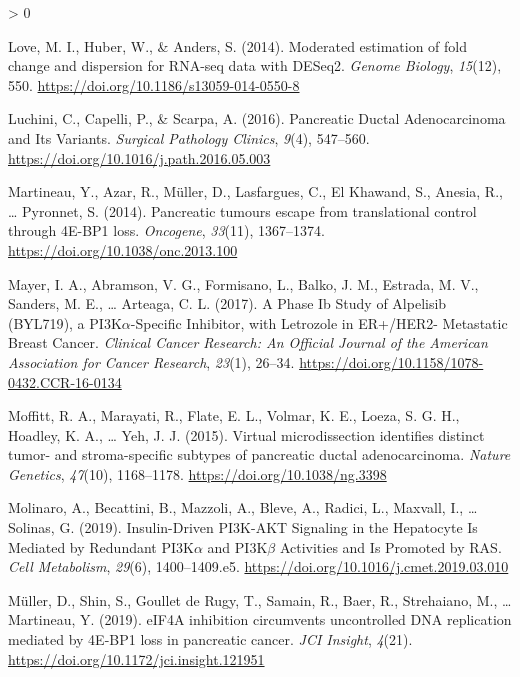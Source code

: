 \documentclass[
  12pt,
  openany]{book}
\newlength{\cslhangindent}
\newenvironment{CSLReferences}[2] %
 {%
  \setlength{\parindent}{0pt}
  \ifodd #1 \everypar{\setlength{\hangindent}{\cslhangindent}}\ignorespaces\fi
  \ifnum #2 > 0
  \setlength{\parskip}{#2\baselineskip}
  \fi
 }%
 {}
\begin{document}
\begin{CSLReferences}{1}{0}
\leavevmode\hypertarget{ref-Love2014}{}%
Love, M. I., Huber, W., \& Anders, S. (2014). Moderated estimation of fold change and dispersion for {RNA}-seq data with {DESeq2}. \emph{Genome Biology}, \emph{15}(12), 550. \url{https://doi.org/10.1186/s13059-014-0550-8}

\leavevmode\hypertarget{ref-Luchini2016}{}%
Luchini, C., Capelli, P., \& Scarpa, A. (2016). Pancreatic {Ductal Adenocarcinoma} and {Its Variants}. \emph{Surgical Pathology Clinics}, \emph{9}(4), 547--560. \url{https://doi.org/10.1016/j.path.2016.05.003}

\leavevmode\hypertarget{ref-Martineau2014}{}%
Martineau, Y., Azar, R., Müller, D., Lasfargues, C., El Khawand, S., Anesia, R., \ldots{} Pyronnet, S. (2014). Pancreatic tumours escape from translational control through {4E}-{BP1} loss. \emph{Oncogene}, \emph{33}(11), 1367--1374. \url{https://doi.org/10.1038/onc.2013.100}

\leavevmode\hypertarget{ref-Mayer2017}{}%
Mayer, I. A., Abramson, V. G., Formisano, L., Balko, J. M., Estrada, M. V., Sanders, M. E., \ldots{} Arteaga, C. L. (2017). A {Phase Ib Study} of {Alpelisib} ({BYL719}), a {PI3K\(\alpha\)}-{Specific Inhibitor}, with {Letrozole} in {ER}+/{HER2}- {Metastatic Breast Cancer}. \emph{Clinical Cancer Research: An Official Journal of the American Association for Cancer Research}, \emph{23}(1), 26--34. \url{https://doi.org/10.1158/1078-0432.CCR-16-0134}

\leavevmode\hypertarget{ref-Moffitt2015}{}%
Moffitt, R. A., Marayati, R., Flate, E. L., Volmar, K. E., Loeza, S. G. H., Hoadley, K. A., \ldots{} Yeh, J. J. (2015). Virtual microdissection identifies distinct tumor- and stroma-specific subtypes of pancreatic ductal adenocarcinoma. \emph{Nature Genetics}, \emph{47}(10), 1168--1178. \url{https://doi.org/10.1038/ng.3398}

\leavevmode\hypertarget{ref-Molinaro2019a}{}%
Molinaro, A., Becattini, B., Mazzoli, A., Bleve, A., Radici, L., Maxvall, I., \ldots{} Solinas, G. (2019). Insulin-{Driven PI3K}-{AKT Signaling} in the {Hepatocyte Is Mediated} by {Redundant PI3K\(\alpha\)} and {PI3K\(\beta\) Activities} and {Is Promoted} by {RAS}. \emph{Cell Metabolism}, \emph{29}(6), 1400--1409.e5. \url{https://doi.org/10.1016/j.cmet.2019.03.010}

\leavevmode\hypertarget{ref-Muller2019}{}%
Müller, D., Shin, S., Goullet de Rugy, T., Samain, R., Baer, R., Strehaiano, M., \ldots{} Martineau, Y. (2019). {eIF4A} inhibition circumvents uncontrolled {DNA} replication mediated by {4E}-{BP1} loss in pancreatic cancer. \emph{JCI Insight}, \emph{4}(21). \url{https://doi.org/10.1172/jci.insight.121951}


\end{CSLReferences}
\end{document}
